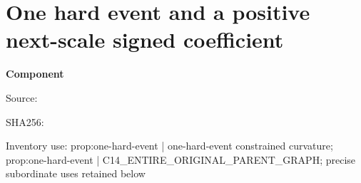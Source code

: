 \chapter{One hard event and a positive next-scale signed coefficient}
\label{component:pb16e5066334b}
\noindent\textbf{Component }\par
{\small\noindent Source: \par}
{\small\noindent SHA256: \par}
{\small\noindent Inventory use: prop:one-hard-event | one-hard-event constrained curvature; prop:one-hard-event | C14\_\allowbreak{}ENTIRE\_\allowbreak{}ORIGINAL\_\allowbreak{}PARENT\_\allowbreak{}GRAPH; precise subordinate uses retained below\par}
\medskip
